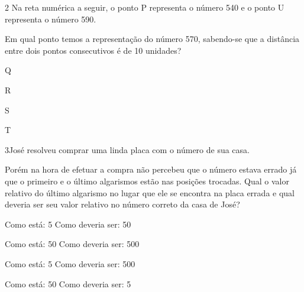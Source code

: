 \num{2} Na reta numérica a seguir, o ponto P representa o número 540 e o
ponto U representa o número 590.


Em qual ponto temos a representação do número 570, sabendo-se que a
distância entre dois pontos consecutivos é de 10 unidades?

\begin{escolha}
\item
  Q
\item
  R
\item
  S
\item
  T
\end{escolha}


\num{3}José resolveu comprar uma linda placa com o número de sua casa.


Porém na hora de efetuar a compra não percebeu que o número estava
errado já que o primeiro e o último algarismos estão nas posições
trocadas. Qual o valor relativo do último algarismo no lugar que ele se
encontra na placa errada e qual deveria ser seu valor relativo no número
correto da casa de José?

\begin{escolha}
\item
  Como está: 5 Como deveria ser: 50
\item
  Como está: 50 Como deveria ser: 500
\item
  Como está: 5 Como deveria ser: 500
\item
  Como está: 50 Como deveria ser: 5
\end{escolha}


